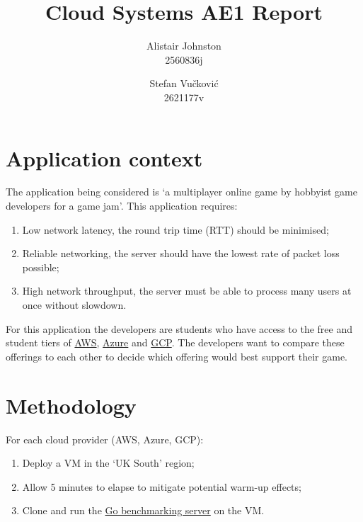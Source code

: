 \documentclass[11pt,a4paper]{article}
\title{Cloud Systems AE1 Report}
\author{
  Alistair Johnston \\  2560836j
  \and
  Stefan Vučković \\ 2621177v
}
\date{{}}
\begin{document}
\flushbottom
\maketitle
\thispagestyle{empty}

\section*{Application context}
The application being considered is `a multiplayer online game by hobbyist game developers for a game jam'.
This application requires:
\begin{enumerate}
\item{Low network latency, the round trip time (RTT) should be minimised};
\item{Reliable networking, the server should have the lowest rate of packet loss possible};
\item{High network throughput, the server must be able to process many users at once without slowdown}.
\end{enumerate}

For this application the developers are students who have access to the free and student tiers of \href{https://aws.amazon.com/free/}{AWS}, \href{https://azure.microsoft.com/en-us/free/students}{Azure} and \href{https://cloud.google.com/free?hl=en}{GCP}. The developers want to compare these offerings to each other to decide which offering would best support their game.

\section*{Methodology}
For each cloud provider (AWS, Azure, GCP):
\begin{enumerate}
  \item{Deploy a VM in the `UK South' region;}
  \item{Allow 5 minutes to elapse to mitigate potential warm-up effects;}
  \item{Clone and run the \href{https://github.com/StefVuck/CloudSystemsAE1/tree/f39212e9e3b1d692e06152948270db8c1668b140/network-perf}{Go benchmarking server} on the VM.}
\end{enumerate}
\end{document}
